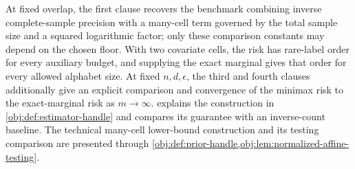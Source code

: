 At fixed overlap, the first clause recovers the benchmark combining inverse complete-sample precision with a many-cell term governed by the total sample size and a squared logarithmic factor; only these comparison constants may depend on the chosen floor. With two covariate cells, the risk has rare-label order for every auxiliary budget, and supplying the exact marginal gives that order for every allowed alphabet size. At fixed \(n,d,\epsilon\), the third and fourth clauses additionally give an explicit comparison and convergence of the minimax risk to the exact-marginal risk as \(m\to\infty\).  explains the construction in \cref{obj:def:estimator-handle} and compares its guarantee with an inverse-count baseline. The technical many-cell lower-bound construction and its testing comparison are presented through \cref{obj:def:prior-handle,obj:lem:normalized-affine-testing}.
